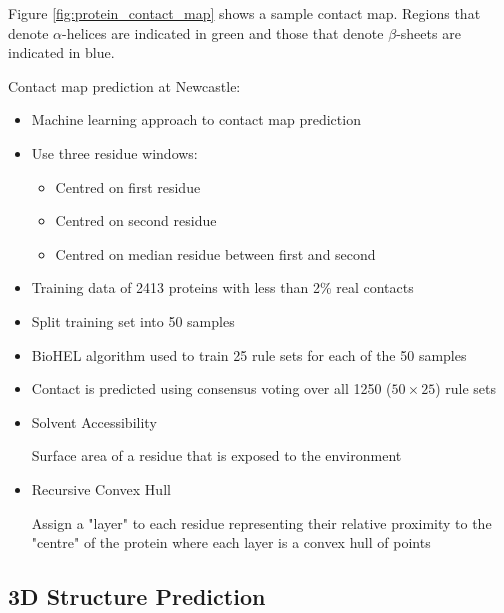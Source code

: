 \documentclass[a4paper]{article}
\begin{document}
Figure \ref{fig:protein_contact_map} shows a sample contact map.  Regions that
denote $\alpha$-helices are indicated in green and those that denote
$\beta$-sheets are indicated in blue.

Contact map prediction at Newcastle:

\begin{itemize}
  \item
    Machine learning approach to contact map prediction

  \item
    Use three residue windows:

    \begin{itemize}
      \item Centred on first residue
      \item Centred on second residue
      \item Centred on median residue between first and second
    \end{itemize}

  \item
    Training data of 2413 proteins with less than 2\% real contacts

  \item
    Split training set into 50 samples

  \item
    BioHEL algorithm used to train 25 rule sets for each of the 50 samples

  \item
    Contact is predicted using consensus voting over all 1250 ($50 \times 25$)
    rule sets
\end{itemize}


\begin{itemize}
  \item
    Solvent Accessibility

    Surface area of a residue that is exposed to the environment

  \item
    Recursive Convex Hull

    Assign a "layer" to each residue representing their relative proximity to
    the "centre" of the protein where each layer is a convex hull of points
\end{itemize}

\subsection{3D Structure Prediction}
\end{document}
